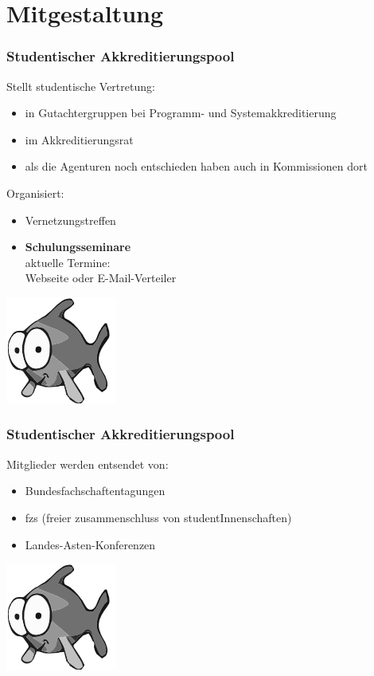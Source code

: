 \documentclass[german,10pt,xcolor=colortbl,compress]{beamer}
\begin{document}
\section{Mitgestaltung}
\frame{\tableofcontents[currentsection]}
\begin{frame}
\frametitle{Studentischer Akkreditierungspool}
Stellt studentische Vertretung:
\begin{itemize}
\item in Gutachtergruppen bei Programm- und Systemakkreditierung
\item im Akkreditierungsrat
\item als die Agenturen noch entschieden haben auch in Kommissionen dort
\end{itemize}
Organisiert:
\begin{itemize}
\item Vernetzungstreffen
\item \textbf{Schulungsseminare}\\
	  aktuelle Termine:\\Webseite oder E-Mail-Verteiler
\end{itemize}
\vspace*{-6mm}
\hspace*{7.5cm}\includegraphics[scale=0.7]{pool.PNG}
\end{frame}
\begin{frame}
\frametitle{Studentischer Akkreditierungspool}
Mitglieder werden entsendet von:
\begin{itemize}
\item Bundesfachschaftentagungen
\item fzs (freier zusammenschluss von studentInnenschaften)
\item Landes-Asten-Konferenzen
\end{itemize}
\vspace*{22mm}
\hspace*{7.5cm}\includegraphics[scale=0.7]{pool.PNG}
\end{frame}
\end{document}
